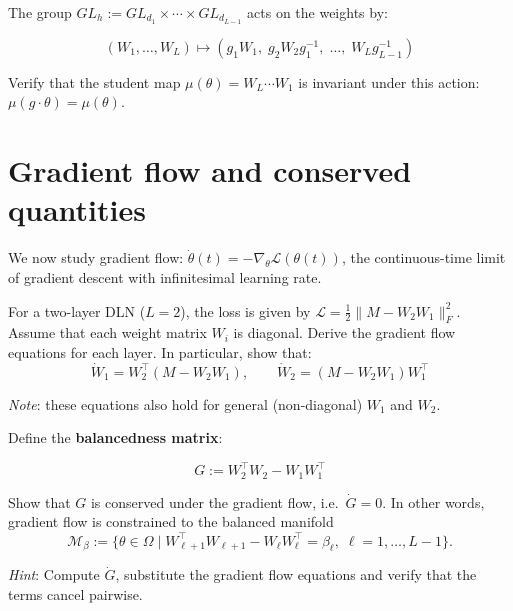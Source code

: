 \documentclass[11pt]{article}
\begin{document}
\begin{exercise}
\label{ex:td-1d}
The group
\(GL_h := GL_{d_1} \times \cdots \times GL_{d_{L-1}}\) acts on the
weights by:

\[(W_1, \ldots, W_L) \mapsto (g_1 W_1,\; g_2 W_2 g_1^{-1},\; \ldots,\; W_L g_{L-1}^{-1})\]

Verify that the student map \(\mu(\theta) = W_L \cdots W_1\) is
invariant under this action: \(\mu(g \cdot \theta) = \mu(\theta)\).
\end{exercise}


\section{Gradient flow and conserved quantities}
\label{sec:td-gradflow}

We now study gradient flow:
\(\dot{\theta}(t) = -\nabla_\theta \mathcal{L}(\theta(t))\), the
continuous-time limit of gradient descent with infinitesimal learning
rate.

\begin{exercise}
\label{ex:td-2a}
For a two-layer DLN (\(L=2\)), the loss is given by \(\mathcal{L} = \frac{1}{2}\|M - W_2 W_1\|_F^2\).
Assume that each weight matrix \(W_i\) is diagonal.
Derive the gradient flow equations for each layer.
In particular, show that:
\[\dot{W}_1 = W_2^\top(M - W_2 W_1), \qquad \dot{W}_2 = (M - W_2 W_1) W_1^\top\]

\emph{Note}: these equations also hold for general (non-diagonal)
\(W_1\) and \(W_2\).
\end{exercise}


\begin{exercise}
\label{ex:td-2b}
Define the \textbf{balancedness matrix}:

\[G := W_2^\top W_2 - W_1 W_1^\top\]

Show that \(G\) is conserved under the gradient flow,
i.e.~\(\dot{G} = 0\). In other words, gradient flow is constrained to the balanced manifold \begin{equation*}
    \mathcal{M}_{\beta}
    :=
    \{\theta\in\Omega\mid
    W_{\ell+1}^{\top}W_{\ell+1}
    -
    W_{\ell}W_{\ell}^{\top}
    =
    \beta_\ell,\;
    \ell=1,\ldots,L-1\}.
\end{equation*}

\emph{Hint}: Compute
\(\dot{G}\),
substitute the gradient flow equations and verify that the
terms cancel pairwise.
\end{exercise}
\end{document}
